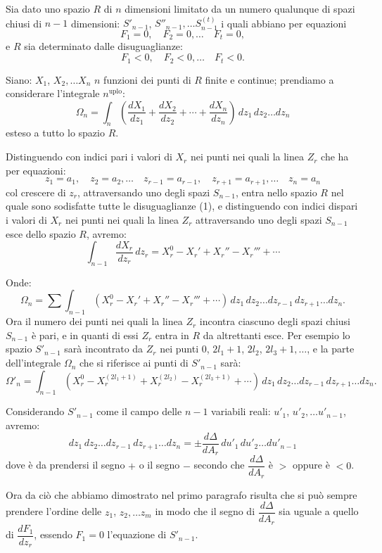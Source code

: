 \documentclass{article}
\begin{document}
Sia dato uno spazio $R$ di $n$ dimensioni limitato da un numero qualunque di spazi chiusi di $n-1$ dimensioni: $S'_{n-1}$, $S''_{n-1},\ldots S^{(t)}_{n-1}$ i quali abbiano per equazioni
\[ F_{1} = 0, \quad F_{2} = 0,\ldots \quad F_{t} = 0, \]
e $R$ sia determinato dalle disuguaglianze:
\[ F_{1} < 0, \quad F_{2} < 0,\ldots \quad F_{t} < 0. \tag{1} \]

Siano: $X_{1}$, $X_{2},\ldots X_{n}$ $n$ funzioni dei punti di $R$ finite e continue; prendiamo a considerare l'integrale $n^{\text{uplo}}$:
\[ \Omega_{n} = \int_{n} \left( \frac{dX_{1}}{dz_{1}} + \frac{dX_{2}}{dz_{2}} + \cdots + \frac{dX_{n}}{dz_{n}} \right)\,dz_{1}\,dz_{2}\ldots dz_{n} \]
esteso a tutto lo spazio $R$.

Distinguendo con indici pari i valori di $X_{r}$ nei punti nei quali la linea $Z_{r}$ che ha per equazioni:
\[ z_{1} = a_{1}, \quad z_{2} = a_{2},\ldots \quad z_{r-1} = a_{r-1}, \quad z_{r+1} = a_{r+1},\ldots \quad z_{n} = a_{n} \tag{2} \]
col crescere di $z_{r}$, attraversando uno degli spazi $S_{n-1}$, entra nello spazio $R$ nel quale sono sodisfatte tutte le disuguaglianze (1), e distinguendo con indici dispari i valori di $X_{r}$ nei punti nei quali la linea $Z_{r}$ attraversando uno degli spazi $S_{n-1}$ esce dello spazio $R$, avremo:
\[ \int_{n-1} \frac{dX_{r}}{dz_{r}}\,dz_{r} = X_{r}^{0} - X_{r}' + X_{r}'' - X_{r}''' + \cdots \]

Onde:
\[ \Omega_{n} = \sum \int_{n-1} (X_{r}^{0} - X_{r}' + X_{r}'' - X_{r}''' + \cdots)\,dz_{1}\,dz_{2}\ldots dz_{r-1}\,dz_{r+1}\ldots dz_{n}. \]
Ora il numero dei punti nei quali la linea $Z_{r}$ incontra ciascuno degli spazi chiusi $S_{n-1}$ è pari, e in quanti di essi $Z_{r}$ entra in $R$ da altrettanti esce. Per esempio lo spazio $S'_{n-1}$ sarà incontrato da $Z_{r}$ nei punti 0, $2l_{1}+1$, $2l_{2}$, $2l_{3}+1,\ldots$, e la parte dell'integrale $\Omega_{n}$ che si riferisce ai punti di $S'_{n-1}$ sarà:
\[ \Omega'_{n} = \int_{n-1} (X_{r}^{0} - X_{r}^{(2l_{1}+1)} + X_{r}^{(2l_{2})} - X_{r}^{(2l_{3}+1)} + \cdots)\,dz_{1}\,dz_{2}\ldots dz_{r-1}\,dz_{r+1}\ldots dz_{n}. \]

Considerando $S'_{n-1}$ come il campo delle $n-1$ variabili reali: $u'_{1}$, $u'_{2},\ldots u'_{n-1}$, avremo:
\[ dz_{1}\,dz_{2}\ldots dz_{r-1}\,dz_{r+1}\ldots dz_{n} = \pm \frac{d\Delta}{dA_{r}}\,du'_{1}\,du'_{2}\ldots du'_{n-1} \]
dove è da prendersi il segno $+$ o il segno $-$ secondo che $\dfrac{d\Delta}{dA_{r}}$ è $>$ oppure è $< 0$.

Ora da ciò che abbiamo dimostrato nel primo paragrafo risulta che si può sempre prendere l'ordine delle $z_{1}$, $z_{2},\ldots z_{m}$ in modo che il segno di $\dfrac{d\Delta}{dA_{r}}$ sia uguale a quello di $\dfrac{dF_{1}}{dz_{r}}$, essendo $F_{1} = 0$ l'equazione di $S'_{n-1}$.
\end{document}
